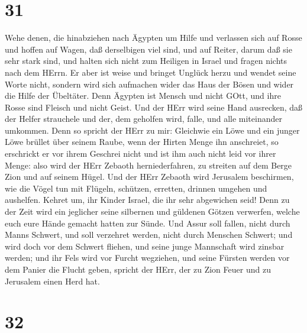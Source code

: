 \hypertarget{section-30}{%
\section{31}\label{section-30}}

 Wehe denen, die hinabziehen nach Ägypten um Hilfe und
verlassen sich auf Rosse und hoffen auf Wagen, daß derselbigen viel
sind, und auf Reiter, darum daß sie sehr stark sind, und halten sich
nicht zum Heiligen in Israel und fragen nichts nach dem HErrn.
 Er aber ist weise und bringet Unglück herzu und wendet
seine Worte nicht, sondern wird sich aufmachen wider das Haus der Bösen
und wider die Hilfe der Übeltäter.  Denn Ägypten ist Mensch
und nicht GOtt, und ihre Rosse sind Fleisch und nicht Geist. Und der
HErr wird seine Hand ausrecken, daß der Helfer strauchele und der, dem
geholfen wird, falle, und alle miteinander umkommen.  Denn
so spricht der HErr zu mir: Gleichwie ein Löwe und ein junger Löwe
brüllet über seinem Raube, wenn der Hirten Menge ihn anschreiet, so
erschrickt er vor ihrem Geschrei nicht und ist ihm auch nicht leid vor
ihrer Menge: also wird der HErr Zebaoth herniederfahren, zu streiten auf
dem Berge Zion und auf seinem Hügel.  Und der HErr Zebaoth
wird Jerusalem beschirmen, wie die Vögel tun mit Flügeln, schützen,
erretten, drinnen umgehen und aushelfen.  Kehret um, ihr
Kinder Israel, die ihr sehr abgewichen seid!  Denn zu der
Zeit wird ein jeglicher seine silbernen und güldenen Götzen verwerfen,
welche euch eure Hände gemacht hatten zur Sünde.  Und Assur
soll fallen, nicht durch Manns Schwert, und soll verzehret werden, nicht
durch Menschen Schwert; und wird doch vor dem Schwert fliehen, und seine
junge Mannschaft wird zinsbar werden;  und ihr Fels wird vor
Furcht wegziehen, und seine Fürsten werden vor dem Panier die Flucht
geben, spricht der HErr, der zu Zion Feuer und zu Jerusalem einen Herd
hat.

\hypertarget{section-31}{%
\section{32}\label{section-31}}


